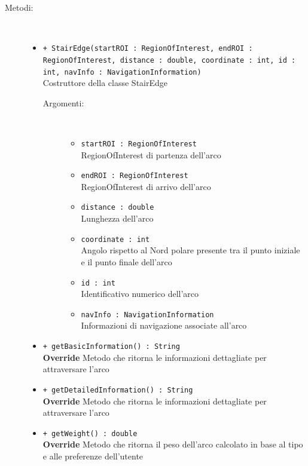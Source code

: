 \documentclass[../DefinizioneDiProdotto.tex]{subfiles}
\begin{document}
\begin{description}
\begin{itemize}
	\end{itemize}
	\item[Metodi:] \
	\begin{itemize}
		\item \texttt{+ StairEdge(startROI : RegionOfInterest, endROI : RegionOfInterest, distance : double, coordinate : int, id : int, navInfo : NavigationInformation)}\\
		Costruttore della classe StairEdge
		\begin{description}
			\item[Argomenti:] \
			\begin{itemize}
				\item \texttt{startROI : RegionOfInterest}\\
				RegionOfInterest di partenza dell'arco\item \texttt{endROI : RegionOfInterest}\\
				RegionOfInterest di arrivo dell'arco\item \texttt{distance : double}\\
				Lunghezza dell'arco\item \texttt{coordinate : int}\\
				Angolo rispetto al Nord polare presente tra il punto iniziale e il punto finale dell'arco\item \texttt{id : int}\\
				Identificativo numerico dell'arco\item \texttt{navInfo : NavigationInformation}\\
				Informazioni di navigazione associate all'arco\end{itemize}
		\end{description}
		\item \texttt{+ getBasicInformation() : String}\\
		\textbf{Override} Metodo che ritorna le informazioni dettagliate per attraversare l'arco
		\item \texttt{+ getDetailedInformation() : String}\\
		\textbf{Override} Metodo che ritorna le informazioni dettagliate per attraversare l'arco
		\item \texttt{+ getWeight() : double}\\
		\textbf{Override} Metodo che ritorna il peso dell'arco calcolato in base al tipo e alle preferenze dell'utente
	\end{itemize}
\end{description}
\end{document}
